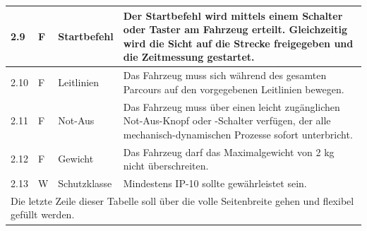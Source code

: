 \documentclass[../main.tex]{subfiles}
\begin{document}
\begin{tabular}{|l|p{0.5cm}|p{4cm}|p{10cm}|}
  \hline
  2.9          & F                     & Startbefehl                                                           & Der Startbefehl wird mittels einem Schalter oder Taster am Fahrzeug erteilt. Gleichzeitig wird die Sicht auf die Strecke freigegeben und die Zeitmessung gestartet.                                                                                                                                                                        \\
  \hline
  2.10         & F                     & Leitlinien                                                            & Das Fahrzeug muss sich während des gesamten Parcours auf den vorgegebenen Leitlinien bewegen.                                                                                                                                                                                                                                              \\
  \hline
  2.11         & F                     & Not-Aus                                                               & Das Fahrzeug muss über einen leicht zugänglichen Not-Aus-Knopf oder -Schalter verfügen, der alle mechanisch-dynamischen Prozesse sofort unterbricht.                                                                                                                                                                                       \\
  \hline
  2.12         & F                     & Gewicht                                                               & Das Fahrzeug darf das Maximalgewicht von 2 kg nicht überschreiten.                                                                                                                                                                                                                                                                         \\
  \hline
  2.13         & W                     & Schutzklasse                                                          & Mindestens IP-10 sollte gewährleistet sein.                                                                                                                                                                                                                                                                                                \\
  \hline
  \multicolumn{4}{|p{\dimexpr1.5cm+3cm+6cm+1.5cm}|}{Die letzte Zeile dieser Tabelle soll über die volle Seitenbreite gehen und flexibel gefüllt werden.}                                                                                                                                                                                                                                                                                                    \\
  \hline
\end{tabular}
\end{document}
